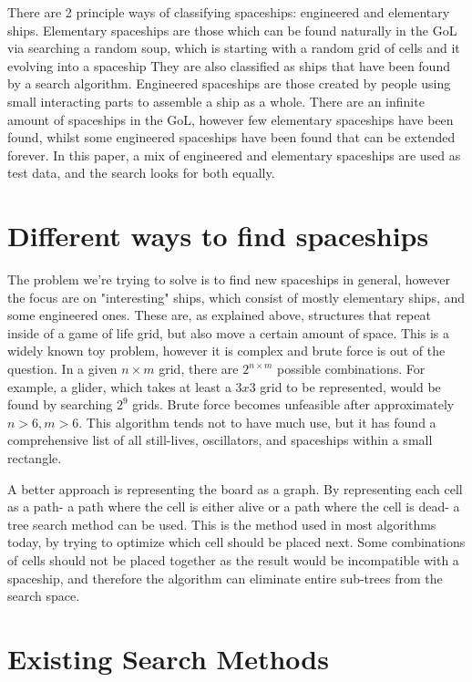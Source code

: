 \documentclass{l4proj}
\begin{document}
There are 2 principle ways of classifying spaceships: engineered and elementary ships. Elementary spaceships are those which can be found naturally in the GoL via searching a random soup, which is starting with a random grid of cells and it evolving into a spaceship They are also classified as ships that have been found by a search algorithm. Engineered spaceships are those created by people using small interacting parts to assemble a ship as a whole. There are an infinite amount of spaceships in the GoL, however few elementary spaceships have been found, whilst some engineered spaceships have been found that can be extended forever. In this paper, a mix of engineered and elementary spaceships are used as test data, and the search looks for both equally.


\section{Different ways to find spaceships}

The problem we're trying to solve is to find new spaceships in general, however the focus are on "interesting" ships, which consist of mostly elementary ships, and some engineered ones. These are, as explained above, structures that repeat inside of a game of life grid, but also move a certain amount of space. This is a widely known toy problem, however it is complex and brute force is out of the question. In a given $n \times m$ grid, there are $2^{n \times m}$ possible combinations. For example, a glider, which takes at least a $3x3$ grid to be represented, would be found by searching $2^{9}$ grids. Brute force becomes unfeasible after approximately $n > 6, m > 6$. This algorithm tends not to have much use, but it has found a comprehensive list of all still-lives, oscillators, and spaceships within a small rectangle.

A better approach is representing the board as a graph. By representing each cell as a path- a path where the cell is either alive or a path where the cell is dead- a tree search method can be used. This is the method used in most algorithms today, by trying to optimize which cell should be placed next. Some combinations of cells should not be placed together as the result would be incompatible with a spaceship, and therefore the algorithm can eliminate entire sub-trees from the search space.

\section{Existing Search Methods}
\end{document}
